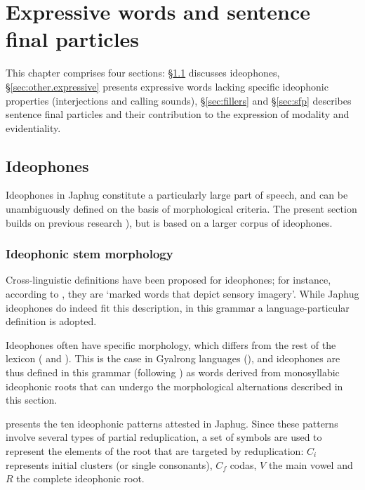 \chapter{Expressive words and sentence final particles} \label{chap:ideophones.sfp}
This chapter comprises four sections: §\ref{sec:idph} discusses ideophones, §\ref{sec:other.expressive} presents expressive words lacking specific ideophonic properties (interjections and calling sounds), §\ref{sec:fillers} and §\ref{sec:sfp} describes sentence final particles and their contribution to the expression of modality and evidentiality.

\section{Ideophones} \label{sec:idph} 
Ideophones in Japhug constitute a particularly large part of speech, and can be unambiguously defined on the basis of morphological criteria. The present section builds on previous research \citep{jackson04zhuangmaoci, japhug14ideophones}), but is based on a  larger corpus of ideophones.

\subsection{Ideophonic stem morphology} \label{sec:ideo:morpho}
Cross-linguistic definitions have been proposed for ideophones; for instance, according to \citet[2]{dingemanse14}, they are `marked words that depict sensory imagery'.  While  Japhug ideophones do indeed fit this description, in this grammar a language-particular definition is adopted. 

Ideophones often have specific morphology, which differs from the rest of the lexicon (\citealt{diffloth76expressives} and  \citealt{zwicky87expressive}). This is the case in Gyalrong languages (\citealt[3--4]{jackson04zhuangmaoci}), and ideophones are thus defined in this grammar (following \citealt{japhug14ideophones}) as words derived from monosyllabic ideophonic roots that can undergo the morphological alternations described in this section. 

 presents the ten ideophonic patterns attested in Japhug. Since these patterns involve several types of partial reduplication, a set of symbols are used to represent the elements of the root that are targeted by reduplication: $C_i$ represents initial clusters (or single consonants), $C_f$ codas, $V$ the main vowel and $R$ the complete ideophonic root.

